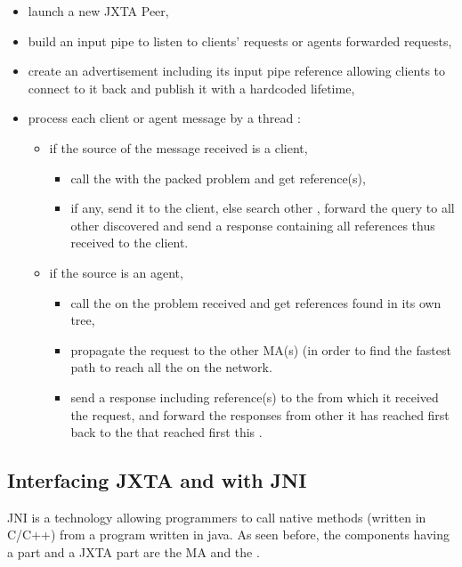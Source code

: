 \begin{itemize}
\item{launch a new JXTA Peer,}
\item{build an input pipe to listen to clients' requests or agents forwarded
  requests,}
\item{create an advertisement including its input pipe reference allowing
  clients to connect to it back and publish it with a hardcoded lifetime,}
\item{process each client or agent message by a thread :
\begin{itemize}
\item{if the source of the message received is a client,}
  \begin{itemize}
  \item{call the \MAdiet with the packed problem and get \sed reference(s),}
  \item{if any, send it to the client, else search other \MAj, forward the
    query to all other \MAsj discovered and send a response containing all \sed
    references thus received to the client.}
  \end{itemize}
\item{if the source is an agent,}
  \begin{itemize}
  \item{call the \MAdiet on the problem received and get \sed references found
    in its own \diet tree, }
  \item{propagate the request to the other MA(s) (in order to find the fastest
    path to reach all the \MAsj on the network.}
  \item{send a response including \sed reference(s) to the \MAj from which it
    received the request, and forward the responses from other \MAsj it has
    reached first back to the \MAj that reached first this \MAj.}
  \end{itemize}
\end{itemize}}
\end{itemize}

\subsection{Interfacing JXTA and \diet with JNI}
\label{ssec:jni}

JNI is a technology allowing programmers to call native methods (written in
C/C++) from a program written in java. As seen before, the \dietj components
having a \diet part and a JXTA part are the MA and the \sed.

